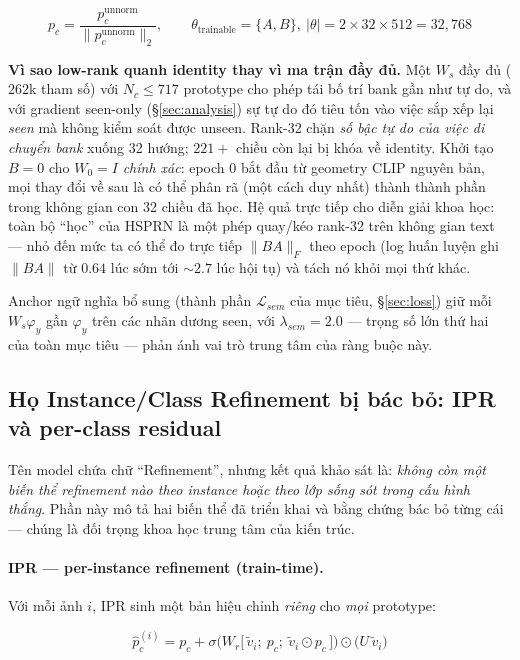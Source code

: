 \documentclass[10pt,twocolumn,letterpaper]{article}
\newcommand{\vtilde}{\tilde{v}}
\newcommand{\phat}{\hat{p}}
\begin{document}
\begin{equation}
p_c = \frac{p_c^{\text{unnorm}}}{\|p_c^{\text{unnorm}}\|_2},
\qquad
\theta_{\text{trainable}} = \{A, B\},\ |\theta| = 2\times 32\times 512 = 32{,}768
\label{eq:ws-norm}
\end{equation}

\textbf{Vì sao low-rank quanh identity thay vì ma trận đầy đủ.} Một $W_s$ đầy đủ ($262$k tham số) với $N_c \le 717$ prototype cho phép tái bố trí bank gần như tự do, và với gradient seen-only (§\ref{sec:analysis}) sự tự do đó tiêu tốn vào việc sắp xếp lại \emph{seen} mà không kiểm soát được unseen. Rank-32 chặn \emph{số bậc tự do của việc di chuyển bank} xuống 32 hướng; $221{+}$ chiều còn lại bị khóa về identity. Khởi tạo $B=0$ cho $W_0 = I$ \emph{chính xác}: epoch 0 bắt đầu từ geometry CLIP nguyên bản, mọi thay đổi về sau là có thể phân rã (một cách duy nhất) thành thành phần trong không gian con 32 chiều đã học. Hệ quả trực tiếp cho diễn giải khoa học: toàn bộ ``học'' của HSPRN là một phép quay/kéo rank-32 trên không gian text — nhỏ đến mức ta có thể đo trực tiếp $\|BA\|_F$ theo epoch (log huấn luyện ghi $\|BA\|$ từ $0.64$ lúc sớm tới ${\sim}2.7$ lúc hội tụ) và tách nó khỏi mọi thứ khác.

Anchor ngữ nghĩa bổ sung (thành phần $\mathcal L_{sem}$ của mục tiêu, §\ref{sec:loss}) giữ mỗi $W_s\varphi_y$ gần $\varphi_y$ trên các nhãn dương seen, với $\lambda_{sem}=2.0$ — trọng số lớn thứ hai của toàn mục tiêu — phản ánh vai trò trung tâm của ràng buộc này.

\subsection{Họ Instance/Class Refinement bị bác bỏ: IPR và per-class residual}
\label{sec:ipr}

Tên model chứa chữ ``Refinement'', nhưng kết quả khảo sát là: \emph{không còn một biến thể refinement nào theo instance hoặc theo lớp sống sót trong cấu hình thắng}. Phần này mô tả hai biến thể đã triển khai và bằng chứng bác bỏ từng cái — chúng là đối trọng khoa học trung tâm của kiến trúc.

\paragraph{IPR — per-instance refinement (train-time).}
Với mỗi ảnh $i$, IPR sinh một bản hiệu chỉnh \emph{riêng} cho \emph{mọi} prototype:

\begin{equation}
\phat_{c}^{(i)}
= p_c + \sigma\!\Big(W_r\big[\,\vtilde_i;\ p_c;\ \vtilde_i\odot p_c\,\big]\Big)\odot\big(U\,\vtilde_i\big)
\label{eq:ipr}
\end{equation}
\end{document}
